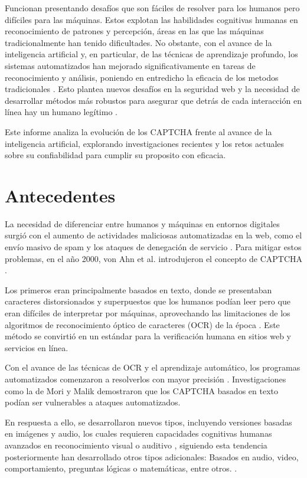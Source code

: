 \documentclass[conference]{IEEEtran}
\begin{document}
Funcionan presentando desafíos que son fáciles de resolver para los humanos pero difíciles para las máquinas. Estos explotan las habilidades cognitivas humanas en reconocimiento de patrones y percepción, áreas en las que las máquinas tradicionalmente han tenido dificultades. No obstante, con el avance de la inteligencia artificial y, en particular, de las técnicas de aprendizaje profundo, los sistemas automatizados han mejorado significativamente en tareas de reconocimiento y análisis, poniendo en entredicho la eficacia de los metodos tradicionales \cite{Kumar2022, Kovacs2023, Mori2003}. Esto plantea nuevos desafíos en la seguridad web y la necesidad de desarrollar métodos más robustos para asegurar que detrás de cada interacción en línea hay un humano legítimo \cite{Bursztein2011}.

Este informe analiza la evolución de los CAPTCHA frente al avance de la inteligencia artificial, explorando investigaciones recientes y los retos actuales sobre su confiabilidad para cumplir su proposito con eficacia.

\bigskip

\section{Antecedentes}

La necesidad de diferenciar entre humanos y máquinas en entornos digitales surgió con el aumento de actividades maliciosas automatizadas en la web, como el envío masivo de spam y los ataques de denegación de servicio \cite{VonAhn2003}. Para mitigar estos problemas, en el año 2000, von Ahn et al. introdujeron el concepto de CAPTCHA \cite{VonAhn2003}.

Los primeros eran principalmente basados en texto, donde se presentaban caracteres distorsionados y superpuestos que los humanos podían leer pero que eran difíciles de interpretar por máquinas, aprovechando las limitaciones de los algoritmos de reconocimiento óptico de caracteres (OCR) de la época \cite{Mori2003}. Este método se convirtió en un estándar para la verificación humana en sitios web y servicios en línea.

Con el avance de las técnicas de OCR y el aprendizaje automático, los programas automatizados comenzaron a resolverlos con mayor precisión \cite{Yan2008}. Investigaciones como la de Mori y Malik \cite{Mori2003} demostraron que los CAPTCHA basados en texto podían ser vulnerables a ataques automatizados.

En respuesta a ello, se desarrollaron nuevos tipos, incluyendo versiones basadas en imágenes y audio, los cuales requieren capacidades cognitivas humanas avanzados en reconocimiento visual o auditivo  \cite{Gossweiler2009}, siguiendo esta tendencia posteriormente han desarrollado otros tipos adicionales: Basados en audio, video, comportamiento, preguntas lógicas o matemáticas, entre otros. \cite{HernandezCastro2010, Kluever2009, Murdoch2020}.
\end{document}

